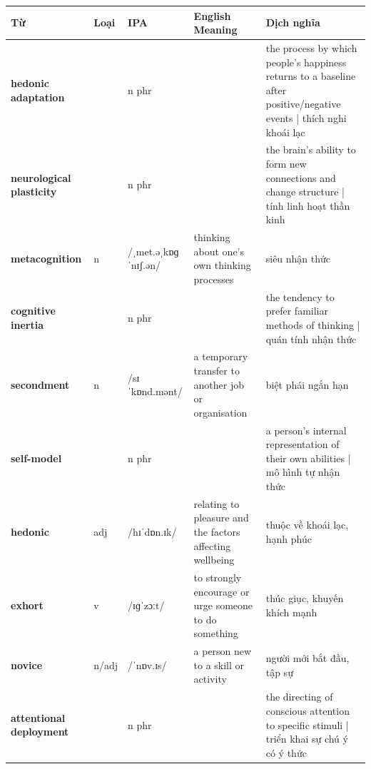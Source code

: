 \vspace{0.8em}
\begin{center}
\renewcommand{\arraystretch}{1.65}
\begin{tabularx}{\textwidth}{|V{0.22\textwidth}|C{0.07\textwidth}|I{0.20\textwidth}|Y|V{0.18\textwidth}|}
\hline
{}
\textbf{Từ} & \textbf{Loại} & \textbf{IPA} & \textbf{English Meaning} & \textbf{Dịch nghĩa} \\
\hline
\textbf{hedonic adaptation} & & n phr & & the process by which people's happiness returns to a baseline after positive/negative events | thích nghi khoái lạc \\ \hline
\textbf{neurological plasticity} & & n phr & & the brain's ability to form new connections and change structure | tính linh hoạt thần kinh \\ \hline
\textbf{metacognition} & n & /ˌmet.əˌkɒɡˈnɪʃ.ən/ & thinking about one's own thinking processes & siêu nhận thức \\ \hline
\textbf{cognitive inertia} & & n phr & & the tendency to prefer familiar methods of thinking | quán tính nhận thức \\ \hline
\textbf{secondment} & n & /sɪˈkɒnd.mənt/ & a temporary transfer to another job or organisation & biệt phái ngắn hạn \\ \hline
\textbf{self-model} & & n phr & & a person's internal representation of their own abilities | mô hình tự nhận thức \\ \hline
\textbf{hedonic} & adj & /hɪˈdɒn.ɪk/ & relating to pleasure and the factors affecting wellbeing & thuộc về khoái lạc, hạnh phúc \\ \hline
\textbf{exhort} & v & /ɪɡˈzɔːt/ & to strongly encourage or urge someone to do something & thúc giục, khuyến khích mạnh \\ \hline
\textbf{novice} & n/adj & /ˈnɒv.ɪs/ & a person new to a skill or activity & người mới bắt đầu, tập sự \\ \hline
\textbf{attentional deployment} & & n phr & & the directing of conscious attention to specific stimuli | triển khai sự chú ý có ý thức \\ \hline
\end{tabularx}
\end{center}

\newpage

